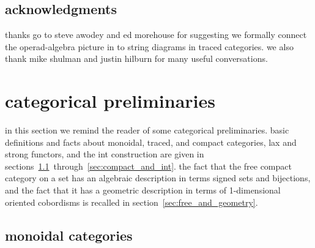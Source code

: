 \documentclass[11pt,oneside,article]{memoir}
\begin{document}
\section*{acknowledgments}

thanks go to steve awodey and ed morehouse for suggesting we formally connect the operad-algebra
picture in \cite{rupelspivak} to string diagrams in traced categories. we also thank mike shulman
and justin hilburn for many useful conversations.

\chapter{categorical preliminaries}\label{chap:traced_categories}

in this section we remind the reader of some categorical preliminaries. basic definitions and facts
about monoidal, traced, and compact categories, lax and strong functors, and the int construction
are given in sections~\ref{sec:prelim_monoidal}~through~\ref{sec:compact_and_int}. the fact that the
free compact category on a set has an algebraic description in terms signed sets and bijections, and
the fact that it has a geometric description in terms of 1-dimensional oriented cobordisms is
recalled in section~\ref{sec:free_and_geometry}.

\section{monoidal categories}\label{sec:prelim_monoidal}
\end{document}
